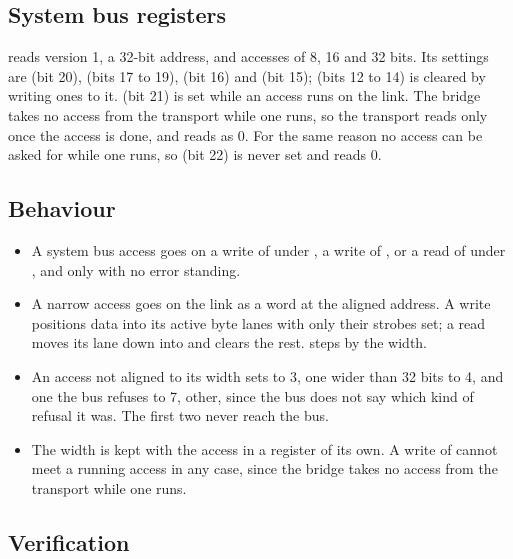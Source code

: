 \subsection*{System bus registers}

 reads version 1, a 32-bit address, and accesses of 8, 16
and 32 bits. Its settings are  (bit 20),
 (bits 17 to 19),  (bit 16) and
 (bit 15);  (bits 12 to 14) is cleared
by writing ones to it.  (bit 21) is set while an access
runs on the link. The bridge takes no access from the transport while
one runs, so the transport reads  only once the access is
done, and reads  as 0. For the same reason no access can
be asked for while one runs, so  (bit 22) is never
set and reads 0.


\subsection*{Behaviour}

\begin{itemize}
\item A system bus access goes on a write of  under
, a write of , or a read of
 under , and only with no error
standing.
\item A narrow access goes on the link as a word at the aligned
address. A write positions data into its active byte lanes with only
their strobes set; a read moves its lane down into  and
clears the rest.  steps by the width.
\item An access not aligned to its width sets  to 3,
one wider than 32 bits to 4, and one the bus refuses to 7, other,
since the bus does not say which kind of refusal it was. The first two
never reach the bus.
\item The width is kept with the access in a register of its own. A
write of  cannot meet a running access in any case, since
the bridge takes no access from the transport while one runs.
\end{itemize}

\subsection*{Verification}

